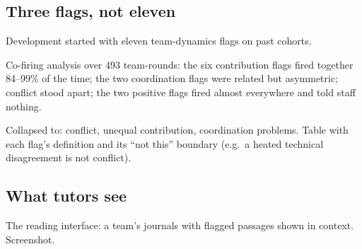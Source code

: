\subsection{Three flags, not eleven}
\begin{outline}
  \item Development started with eleven team-dynamics flags on past cohorts.
  \item Co-firing analysis over 493 team-rounds: the six contribution flags fired together
    84--99\% of the time; the two coordination flags were related but asymmetric; conflict
    stood apart; the two positive flags fired almost everywhere and told staff nothing.
  \item Collapsed to: conflict, unequal contribution, coordination problems. Table with
    each flag's definition and its ``not this'' boundary (e.g.\ a heated technical
    disagreement is not conflict).
\end{outline}

\subsection{What tutors see}
\begin{outline}
  \item The reading interface: a team's journals with flagged passages shown in context.
    Screenshot. 
\end{outline}
